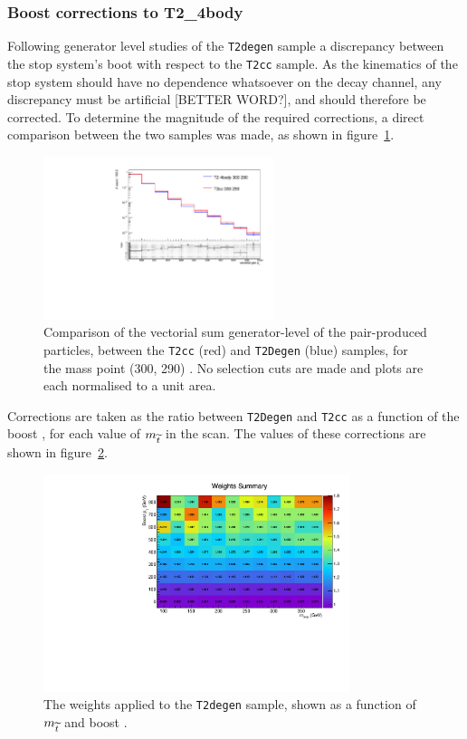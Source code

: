 \subsubsection{Boost corrections to T2\_4body}
Following generator level studies of the \texttt{T2degen} sample a discrepancy 
between the stop system's boot \Pt with respect to the \texttt{T2cc} sample. As 
the kinematics of the stop system should have no dependence whatsoever on the 
decay channel, any discrepancy must be artificial [BETTER WORD?], and should 
therefore be corrected. To determine the magnitude of the required corrections, 
a direct comparison between the two samples was made, as shown in
figure~\ref{fig:t2degen_boost_compare}.

\begin{figure}[h!]
  \centering
    \includegraphics[width=0.6\textwidth]{Figs/sms/t2degen/corrs/compar_stopGenPtVect_0_inc_inc_T2cc_noCuts_sitv_log.pdf}
  \caption{Comparison of the vectorial sum generator-level \Pt of the
  pair-produced \sTop particles, between the \texttt{T2cc} (red) and
  \texttt{T2Degen} (blue) 
  samples, for the mass point (300, 290) \gev. No selection cuts are made and 
  plots are each normalised to a unit area.}
  \label{fig:t2degen_boost_compare}
\end{figure}

Corrections are taken as the ratio between \texttt{T2Degen} and \texttt{T2cc}
as a function of the boost \Pt, for each value of $m_{\widetilde{t}}$ in the scan. The 
values of these corrections are shown in figure~\ref{fig:t2degen_boost_weights}.

\begin{figure}[ht!]
  \centering
    \includegraphics[width=0.8\textwidth]{Figs/sms/t2degen/corrs/stop_lut_weights.pdf}
  \caption{The weights applied to the \texttt{T2degen} sample, shown as a 
  function of $m_{\widetilde{t}}$ and boost \Pt.}
  \label{fig:t2degen_boost_weights}
\end{figure}


